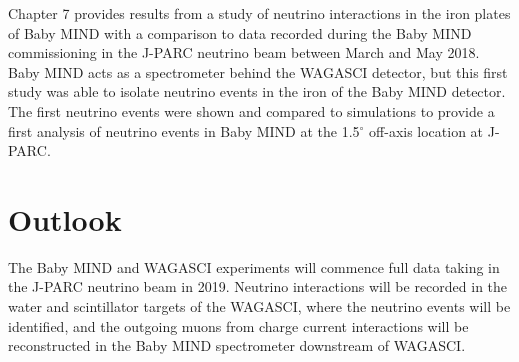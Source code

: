 Chapter 7 provides results from a study of neutrino interactions in the iron plates of Baby MIND with a comparison to data recorded during the Baby MIND commissioning in the J-PARC neutrino beam between March and May 2018. Baby MIND acts as a spectrometer behind the WAGASCI detector, but this first study was able to isolate neutrino events in the iron of the Baby MIND detector. The first neutrino events were shown and compared to simulations to provide a first analysis of neutrino events in Baby MIND at the 1.5$^\circ$ off-axis location at J-PARC. 



\section{Outlook}


The Baby MIND and WAGASCI experiments will commence full data taking in the J-PARC neutrino beam in 2019. Neutrino interactions will be recorded in the water and scintillator targets of the WAGASCI, where the neutrino events will be identified, and the outgoing muons from charge current interactions will be reconstructed in the Baby MIND spectrometer downstream of WAGASCI.





